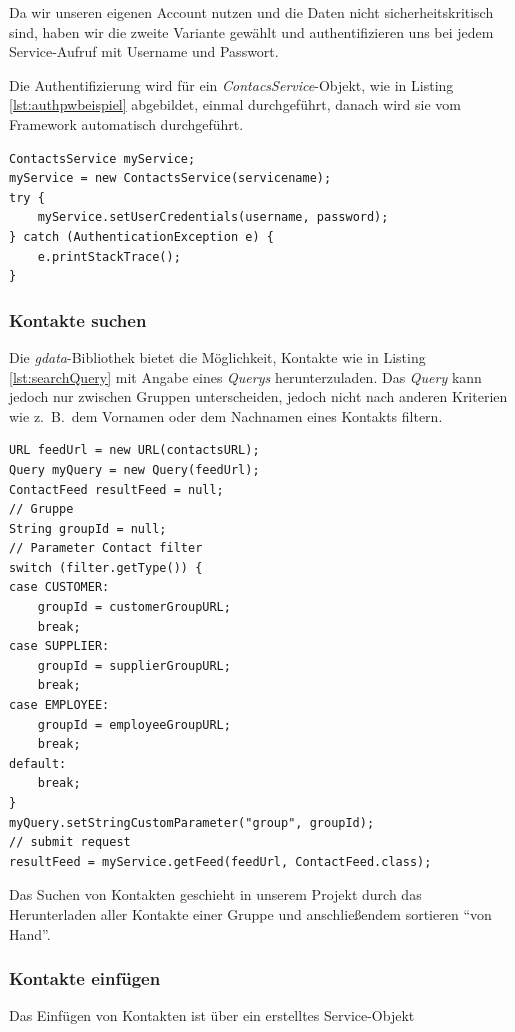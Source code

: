 Da wir unseren eigenen Account nutzen und die Daten nicht sicherheitskritisch sind, haben
 wir die zweite Variante gew\"ahlt und authentifizieren uns bei jedem Service-Aufruf mit
 Username und Passwort.

Die Authentifizierung wird für ein \emph{ContacsService}-Objekt, wie in Listing
 \ref{lst:authpwbeispiel} abgebildet, einmal durchgeführt, danach wird sie vom Framework
 automatisch durchgeführt.

\begin{lstlisting}
ContactsService myService;
myService = new ContactsService(servicename);
try {
	myService.setUserCredentials(username, password);
} catch (AuthenticationException e) {
	e.printStackTrace();
}
\end{lstlisting}

\subsubsection{Kontakte suchen}
Die \emph{gdata}-Bibliothek bietet die Möglichkeit, Kontakte wie in Listing \ref{lst:searchQuery}
 mit Angabe eines \emph{Querys} herunterzuladen.
Das \emph{Query} kann jedoch nur zwischen Gruppen unterscheiden, jedoch nicht nach anderen
 Kriterien wie z.\ B.\ dem Vornamen oder dem Nachnamen eines Kontakts filtern.

\begin{lstlisting}
URL feedUrl = new URL(contactsURL);
Query myQuery = new Query(feedUrl);
ContactFeed resultFeed = null;
// Gruppe
String groupId = null;
// Parameter Contact filter
switch (filter.getType()) {
case CUSTOMER:
	groupId = customerGroupURL;
	break;
case SUPPLIER:
	groupId = supplierGroupURL;
	break;
case EMPLOYEE:
	groupId = employeeGroupURL;
	break;
default:
	break;
}
myQuery.setStringCustomParameter("group", groupId);
// submit request
resultFeed = myService.getFeed(feedUrl, ContactFeed.class);
\end{lstlisting}

Das Suchen von Kontakten geschieht in unserem Projekt durch das Herunterladen aller Kontakte
 einer Gruppe und anschließendem sortieren "`von Hand"'.

\subsubsection{Kontakte einf\"ugen}
Das Einfügen von Kontakten ist über ein erstelltes Service-Objekt 

